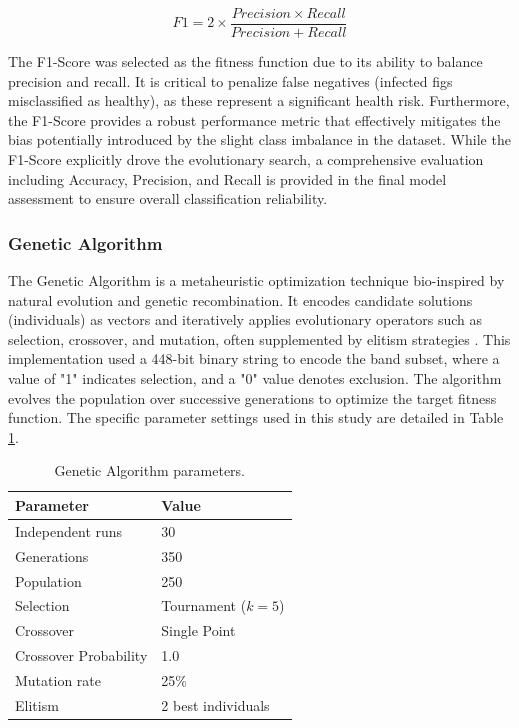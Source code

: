 \documentclass[runningheads]{llncs}
\begin{document}
\begin{equation} \label{eq:f1_score}
    F1=2\times{\frac{Precision \times{Recall}}{Precision + Recall}}
\end{equation}


The F1-Score was selected as the fitness function due to its ability to balance precision and recall. 
It is critical to penalize false negatives (infected figs misclassified as healthy), as these represent a significant health risk. 
Furthermore, the F1-Score provides a robust performance metric that effectively mitigates the bias potentially introduced by the slight class imbalance in the dataset.
While the F1-Score explicitly drove the evolutionary search, a comprehensive evaluation including Accuracy, Precision, and Recall is provided in the final model assessment to ensure overall classification reliability.

\subsubsection{Genetic Algorithm}
The Genetic Algorithm is a metaheuristic optimization technique bio-inspired by natural evolution and genetic recombination. 
It encodes candidate solutions (individuals) as vectors and iteratively applies evolutionary operators such as selection, crossover, and mutation, often supplemented by elitism strategies \cite{eiben_introduction_2015, deb_multi-objective_2001}. 
This implementation used a 448-bit binary string to encode the band subset, where a value of "1" indicates selection, and a "0" value denotes exclusion.
The algorithm evolves the population over successive generations to optimize the target fitness function. 
The specific parameter settings used in this study are detailed in Table \ref{tab1}.

\begin{table}
    \caption{Genetic Algorithm parameters.\label{tab1}}
    \centering
    \begin{tabular}{ll}
        \hline
        {\bfseries Parameter} & {\bfseries Value}\\
        \hline
        Independent runs & 30 \\
        Generations & 350\\
        Population & 250\\
        Selection & Tournament ($k=5$) \\
        Crossover & Single Point \\
        Crossover Probability & 1.0\\
        Mutation rate & 25\%\\
        Elitism & 2 best individuals\\
        \hline
    \end{tabular}
\end{table}
\end{document}
